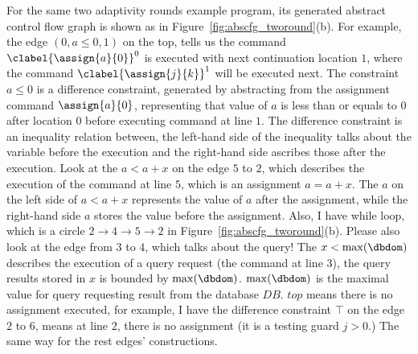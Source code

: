 \begin{example}
    For the same two adaptivity rounds example program, 
its generated abstract control flow graph is shown as in Figure~\ref{fig:abscfg_tworound}(b).
For example, the edge $(0, a \leq 0, 1)$ on the top, tells us the command 
$\clabel{\assign{a}{0}}^0$ is executed with next continuation location $1$,
where the 
command $\clabel{\assign{j}{k}}^1$ will be executed next.
The constraint $a \leq 0$ is a difference constraint, generated by abstracting from the assignment command $\assign{a}{0}$,
representing that value of $a$ is less than or equals to $0$ after 
location $0$ before executing command at line $1$. The difference constraint is an inequality relation between, the left-hand side of the inequality talks about the variable before the execution and the right-hand side ascribes those after the execution. 
Look at the $a < a+x $ on the edge $5$ to $2$, which describes the execution of the command at line $5$, which is an assignment $a = a+x$. The $a$ on the left side of $a < a+x$ represents the value of $a$ after the assignment, while the right-hand side $a$ stores the value before the assignment. 
Also, I have while loop, which is a circle $2 \to 4 \to 5 \to 2$ in Figure~\ref{fig:abscfg_tworound}(b). 
Please also look at the edge from $3$ to $4$, which talks about the query! The $x < \max(\dbdom)$ describes the execution of a query request (the command at line 3), the query results stored in $x$ is bounded by $\max(\dbdom)$. 
$\max(\dbdom)$ is the maximal value for query requesting result from the database $DB$. $top$ means there is no assignment executed, for example, I have the difference constraint $\top$ on the edge $2$ to $6$, means at line $2$, there is no assignment (it is a testing guard $j>0$.) 
%
The same way for the rest edges' constructions.
\begin{figure} 
  \centering
  \begin{subfigure}{.7\textwidth}
\end{subfigure}
\end{figure}
\end{example}
